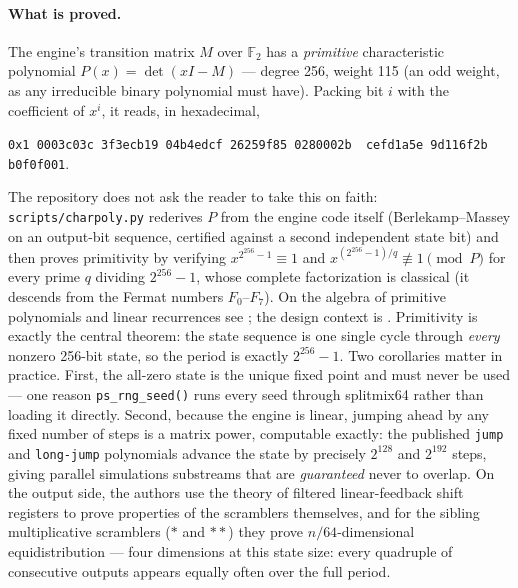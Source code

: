 \documentclass[11pt]{article}
\numberwithin{equation}{section}
\begin{document}
\paragraph{What is proved.}
The engine's transition matrix $M$ over $\mathbb{F}_2$ has a
\emph{primitive} characteristic polynomial
$P(x)=\det(xI-M)$ --- degree 256, weight 115 (an odd weight, as any
irreducible binary polynomial must have).  Packing bit $i$ with the
coefficient of $x^i$, it reads, in hexadecimal,
\begin{center}\small
\texttt{0x1\,0003c03c\,3f3ecb19\,04b4edcf\,26259f85\,0280002b\,%
cefd1a5e\,9d116f2b\,b0f0f001}.
\end{center}
The repository does not ask the reader to take this on faith:
\texttt{scripts/charpoly.py} rederives $P$ from the engine code itself
(Berlekamp--Massey on an output-bit sequence, certified against a second
independent state bit) and then proves primitivity by verifying
$x^{2^{256}-1}\equiv 1$ and $x^{(2^{256}-1)/q}\not\equiv 1 \pmod{P}$ for
every prime $q$ dividing $2^{256}-1$, whose complete factorization is
classical (it descends from the Fermat numbers $F_0$--$F_7$).  On the
algebra of primitive polynomials and linear recurrences see
\citet[ch.~3, ch.~8]{lidl1997}; the design context is
\citet{blackman2021xoshiro}.  Primitivity is exactly the central
theorem: the state sequence is one single cycle through \emph{every}
nonzero 256-bit state, so the period is exactly $2^{256}-1$.  Two
corollaries matter in practice.  First, the all-zero state is the unique
fixed point and must never be used --- one reason \texttt{ps\_rng\_seed()}
runs every seed through splitmix64 rather than loading it directly.
Second, because the engine is linear, jumping ahead by any fixed number of
steps is a matrix power, computable exactly: the published \texttt{jump}
and \texttt{long-jump} polynomials advance the state by precisely
$2^{128}$ and $2^{192}$ steps, giving parallel simulations substreams that
are \emph{guaranteed} never to overlap.  On the output side, the authors
use the theory of filtered linear-feedback shift registers to prove
properties of the scramblers themselves, and for the sibling multiplicative
scramblers ($\ast$ and $\ast\ast$) they prove $n/64$-dimensional
equidistribution --- four dimensions at this state size: every quadruple of
consecutive outputs appears equally often over the full period.
\end{document}
